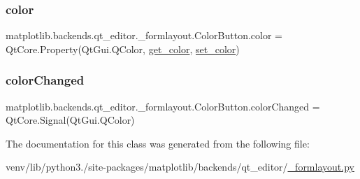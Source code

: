 \subsubsection{\texorpdfstring{color}{color}}
{\footnotesize\ttfamily matplotlib.\+backends.\+qt\+\_\+editor.\+\_\+formlayout.\+Color\+Button.\+color = Qt\+Core.\+Property(Qt\+Gui.\+Q\+Color, \hyperlink{classmatplotlib_1_1backends_1_1qt__editor_1_1__formlayout_1_1ColorButton_a69e9f06d709ad3c7c05902fb7152f31d}{get\+\_\+color}, \hyperlink{classmatplotlib_1_1backends_1_1qt__editor_1_1__formlayout_1_1ColorButton_a01d6301ae5712455c5652e490bef2e56}{set\+\_\+color})\hspace{0.3cm}{\ttfamily [static]}}

\mbox{\label{classmatplotlib_1_1backends_1_1qt__editor_1_1__formlayout_1_1ColorButton_a8b3de582d2b5c5b74d3a33a28b5b61ca}} 
\subsubsection{\texorpdfstring{color\+Changed}{colorChanged}}
{\footnotesize\ttfamily matplotlib.\+backends.\+qt\+\_\+editor.\+\_\+formlayout.\+Color\+Button.\+color\+Changed = Qt\+Core.\+Signal(Qt\+Gui.\+Q\+Color)\hspace{0.3cm}{\ttfamily [static]}}



The documentation for this class was generated from the following file\+:\begin{DoxyCompactItemize}
\item 
venv/lib/python3./site-\/packages/matplotlib/backends/qt\+\_\+editor/\hyperlink{__formlayout_8py}{\+\_\+formlayout.\+py}\end{DoxyCompactItemize}
